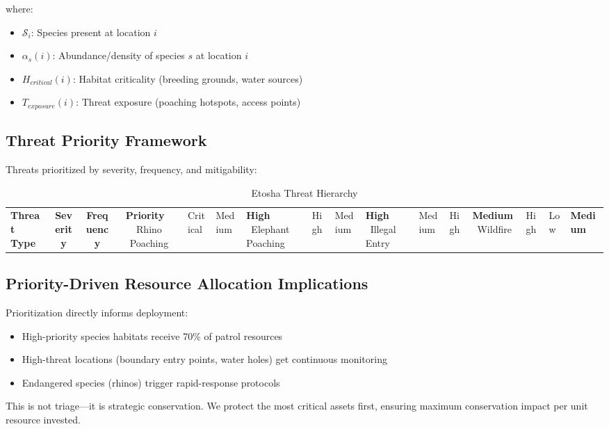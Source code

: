 where:
\begin{itemize}
\item $\mathcal{S}_i$: Species present at location $i$
\item $\alpha_s(i)$: Abundance/density of species $s$ at location $i$
\item $H_{critical}(i)$: Habitat criticality (breeding grounds, water sources)
\item $T_{exposure}(i)$: Threat exposure (poaching hotspots, access points)
\end{itemize}

\subsection{Threat Priority Framework}

Threats prioritized by severity, frequency, and mitigability:

\begin{table}[H]
\centering
\caption{Etosha Threat Hierarchy}
\begin{tabular}{lccc}
\toprule
\textbf{Threat Type} & \textbf{Severity} & \textbf{Frequency} & \textbf{Priority} \
\midrule
Rhino Poaching & Critical & Medium & \textbf{High} \
Elephant Poaching & High & Medium & \textbf{High} \
Illegal Entry & Medium & High & \textbf{Medium} \
Wildfire & High & Low & \textbf{Medium} \
\bottomrule
\end{tabular}
\end{table}

\subsection{Priority-Driven Resource Allocation Implications}

Prioritization directly informs deployment:
\begin{itemize}
\item High-priority species habitats receive 70\% of patrol resources
\item High-threat locations (boundary entry points, water holes) get continuous monitoring
\item Endangered species (rhinos) trigger rapid-response protocols
\end{itemize}

This is not triage—it is strategic conservation. We protect the most critical assets first, ensuring maximum conservation impact per unit resource invested.
